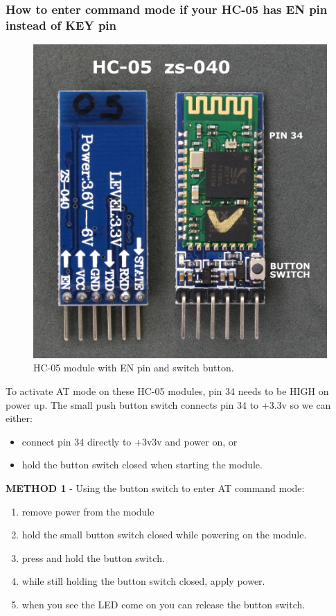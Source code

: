 \subsubsection{How to enter command mode if your HC-05 has EN pin instead of KEY pin}
\begin{figure}[H]
	\centering
	\includegraphics[width=\textwidth]
	{files/images/hc05_en_pin}
	\caption{HC-05 module with EN pin and switch button.}
\end{figure}
To activate AT mode on these HC-05 modules, pin 34 needs to be HIGH on power up. The small push button switch connects pin 34 to +3.3v so we can either:
\begin{itemize}
	\item connect pin 34 directly to +3v3v and power on, or
	\item hold the button switch closed when starting the module.
	
\end{itemize}
\textbf{METHOD 1} - Using the button switch to enter AT command mode:
\begin{enumerate}
	\item remove power from the module
	\item hold the small button switch closed while powering on the module.
	\item press and hold the button switch.
	\item while still holding the button switch closed, apply power.
	\item when you see the LED come on you can release the button switch.
\end{enumerate}
